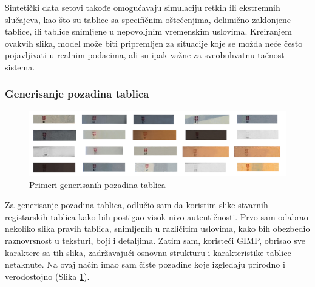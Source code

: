 \documentclass[a4paper,12pt]{article}
\begin{document}
	Sintetički data setovi takođe omogućavaju simulaciju retkih ili ekstremnih slučajeva, kao što su tablice sa specifičnim oštećenjima, delimično zaklonjene tablice, ili tablice snimljene u nepovoljnim vremenskim uslovima. Kreiranjem ovakvih slika, model može biti pripremljen za situacije koje se možda neće često pojavljivati u realnim podacima, ali su ipak važne za sveobuhvatnu tačnost sistema.
	
	\subsubsection{Generisanje pozadina tablica}
	\begin{figure}[H]
		\centering
		\includegraphics[width=\textwidth]{assets/license-plate-backgrounds.png}
		\caption{Primeri generisanih pozadina tablica}
		\label{fig:license-plate-backgrounds}
	\end{figure}
	
	Za generisanje pozadina tablica, odlučio sam da koristim slike stvarnih registarskih tablica kako bih postigao visok nivo autentičnosti. Prvo sam odabrao nekoliko slika pravih tablica, snimljenih u različitim uslovima, kako bih obezbedio raznovrsnost u teksturi, boji i detaljima. Zatim sam, koristeći GIMP, obrisao sve karaktere sa tih slika, zadržavajući osnovnu strukturu i karakteristike tablice netaknute. Na ovaj način imao sam čiste pozadine koje izgledaju prirodno i verodostojno (Slika \ref{fig:license-plate-backgrounds}).
	
\end{document}
